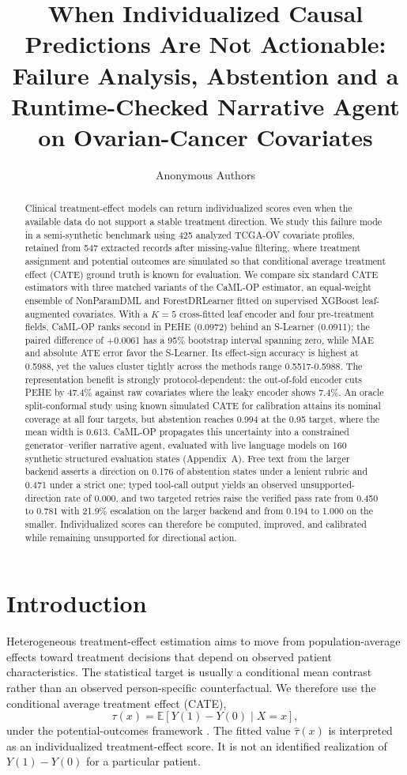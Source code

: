 \documentclass{article}
\title{When Individualized Causal Predictions Are Not Actionable:\\ Failure Analysis, Abstention and a Runtime-Checked Narrative Agent on Ovarian-Cancer Covariates}
\author{Anonymous Authors}
\begin{document}
\maketitle
\begin{abstract}
Clinical treatment-effect models can return individualized scores even when the available data do not support a stable treatment direction. We study this failure mode in a semi-synthetic benchmark using 425 analyzed TCGA-OV covariate profiles, retained from 547 extracted records after missing-value filtering, where treatment assignment and potential outcomes are simulated so that conditional average treatment effect (CATE) ground truth is known for evaluation. We compare six standard CATE estimators with three matched variants of the CaML-OP estimator, an equal-weight ensemble of NonParamDML and ForestDRLearner fitted on supervised XGBoost leaf-augmented covariates. With a $K=5$ cross-fitted leaf encoder and four pre-treatment fields, CaML-OP ranks second in PEHE (0.0972) behind an S-Learner (0.0911); the paired difference of $+$0.0061 has a 95\% bootstrap interval spanning zero, while MAE and absolute ATE error favor the S-Learner. Its effect-sign accuracy is highest at 0.5988, yet the values cluster tightly across the methods range 0.5517-0.5988. The representation benefit is strongly protocol-dependent: the out-of-fold encoder cuts PEHE by 47.4\% against raw covariates where the leaky encoder shows 7.4\%. An oracle split-conformal study using known simulated CATE for calibration attains its nominal coverage at all four targets, but abstention reaches 0.994 at the 0.95 target, where the mean width is 0.613. CaML-OP propagates this uncertainty into a constrained generator--verifier narrative agent, evaluated with live language models on 160 synthetic structured evaluation states (Appendix~A). Free text from the larger backend asserts a direction on 0.176 of abstention states under a lenient rubric and 0.471 under a strict one; typed tool-call output yields an observed unsupported-direction rate of 0.000, and two targeted retries raise the verified pass rate from 0.450 to 0.781 with 21.9\% escalation on the larger backend and from 0.194 to 1.000 on the smaller. Individualized scores can therefore be computed, improved, and calibrated while remaining unsupported for directional action.
\end{abstract}

\section{Introduction}
Heterogeneous treatment-effect estimation aims to move from population-average effects toward treatment decisions that depend on observed patient characteristics. The statistical target is usually a conditional mean contrast rather than an observed person-specific counterfactual. We therefore use the conditional average treatment effect (CATE),
\[
\tau(x)=\mathbb{E}[Y(1)-Y(0)\mid X=x],
\]
under the potential-outcomes framework \citep{imbens2015}. The fitted value $\hat\tau(x)$ is interpreted as an individualized treatment-effect score. It is not an identified realization of $Y(1)-Y(0)$ for a particular patient.
\end{document}
